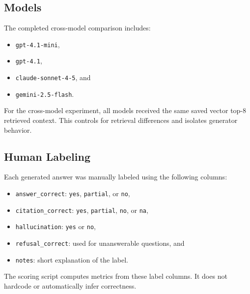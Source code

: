 \documentclass[10pt,twocolumn]{article}
\begin{document}
\subsection{Models}

The completed cross-model comparison includes:

\begin{itemize}[leftmargin=*]
    \item \texttt{gpt-4.1-mini},
    \item \texttt{gpt-4.1},
    \item \texttt{claude-sonnet-4-5}, and
    \item \texttt{gemini-2.5-flash}.
\end{itemize}

For the cross-model experiment, all models received the same saved vector top-8 retrieved context. This controls for retrieval differences and isolates generator behavior.

\subsection{Human Labeling}

Each generated answer was manually labeled using the following columns:

\begin{itemize}[leftmargin=*]
    \item \texttt{answer\_correct}: \texttt{yes}, \texttt{partial}, or \texttt{no},
    \item \texttt{citation\_correct}: \texttt{yes}, \texttt{partial}, \texttt{no}, or \texttt{na},
    \item \texttt{hallucination}: \texttt{yes} or \texttt{no},
    \item \texttt{refusal\_correct}: used for unanswerable questions, and
    \item \texttt{notes}: short explanation of the label.
\end{itemize}

The scoring script computes metrics from these label columns. It does not hardcode or automatically infer correctness.
\end{document}
